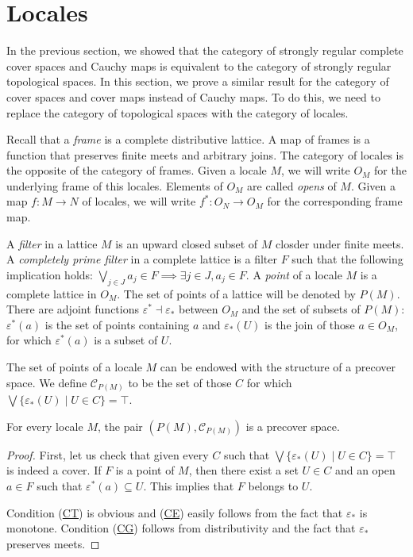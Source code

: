 \documentclass[reqno]{amsart}
\newcommand{\axref}[1]{(\hyperref[ax:#1]{#1})}
\theoremstyle{definition}
\theoremstyle{remark}
\numberwithin{figure}{section}
\begin{document}
\section{Locales}
\label{sec:locales}

In the previous section, we showed that the category of strongly regular complete cover spaces and Cauchy maps is equivalent to the category of strongly regular topological spaces.
In this section, we prove a similar result for the category of cover spaces and cover maps instead of Cauchy maps.
To do this, we need to replace the category of topological spaces with the category of locales.

Recall that a \emph{frame} is a complete distributive lattice.
A map of frames is a function that preserves finite meets and arbitrary joins.
The category of locales is the opposite of the category of frames.
Given a locale $M$, we will write $O_M$ for the underlying frame of this locales.
Elements of $O_M$ are called \emph{opens} of $M$.
Given a map $f : M \to N$ of locales, we will write $f^* : O_N \to O_M$ for the corresponding frame map.

A \emph{filter} in a lattice $M$ is an upward closed subset of $M$ closder under finite meets.
A \emph{completely prime filter} in a complete lattice is a filter $F$ such that the following implication holds: $\bigvee_{j \in J} a_j \in F \implies \exists j \in J, a_j \in F$.
A \emph{point} of a locale $M$ is a complete lattice in $O_M$.
The set of points of a lattice will be denoted by $P(M)$.
There are adjoint functions $\varepsilon^* \dashv \varepsilon_*$ between $O_M$ and the set of subsets of $P(M)$:
$\varepsilon^*(a)$ is the set of points containing $a$ and $\varepsilon_*(U)$ is the join of those $a \in O_M$, for which $\varepsilon^*(a)$ is a subset of $U$.

The set of points of a locale $M$ can be endowed with the structure of a precover space.
We define $\mathcal{C}_{P(M)}$ to be the set of those $C$ for which $\bigvee \{ \varepsilon_*(U) \mid U \in C \} = \top$.

\begin{prop}
For every locale $M$, the pair $(P(M),\mathcal{C}_{P(M)})$ is a precover space.
\end{prop}
\begin{proof}
First, let us check that given every $C$ such that $\bigvee \{ \varepsilon_*(U) \mid U \in C \} = \top$ is indeed a cover.
If $F$ is a point of $M$, then there exist a set $U \in C$ and an open $a \in F$ such that $\varepsilon^*(a) \subseteq U$.
This implies that $F$ belongs to $U$.

Condition \axref{CT} is obvious and \axref{CE} easily follows from the fact that $\varepsilon_*$ is monotone.
Condition \axref{CG} follows from distributivity and the fact that $\varepsilon_*$ preserves meets.
\end{proof}
\end{document}
